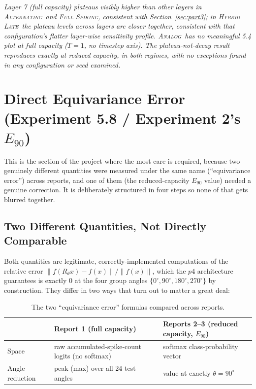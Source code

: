 \documentclass[11pt]{article}
\newcommand{\Analog}{\textsc{Analog}}
\newcommand{\Alternating}{\textsc{Alternating}}
\newcommand{\FullSpiking}{\textsc{Full Spiking}}
\newcommand{\HybridLate}{\textsc{Hybrid Late}}
\begin{document}
\FloatBarrier
\textit{Layer 7 (full capacity) plateaus visibly higher than other layers in \Alternating\ and
\FullSpiking, consistent with Section~\ref{sec:part3}; in \HybridLate\ the plateau levels across layers
are closer together, consistent with that configuration's flatter layer-wise sensitivity profile.
\Analog\ has no meaningful 5.4 plot at full capacity ($T{=}1$, no timestep axis). The plateau-not-decay
result reproduces exactly at reduced capacity, in both regimes, with no exceptions found in any
configuration or seed examined.}

\FloatBarrier

\section{Direct Equivariance Error (Experiment 5.8 / Experiment 2's $E_{90}$)}
\label{sec:part5}

This is the section of the project where the most care is required, because two genuinely different
quantities were measured under the same name (``equivariance error'') across reports, and one of them
(the reduced-capacity $E_{90}$ value) needed a genuine correction. It is deliberately structured in four
steps so none of that gets blurred together.

\subsection{Two Different Quantities, Not Directly Comparable}

Both quantities are legitimate, correctly-implemented computations of the relative error
$\|f(R_\theta x) - f(x)\| / \|f(x)\|$, which the $p4$ architecture guarantees is exactly 0 at the four
group angles $\{0^\circ,90^\circ,180^\circ,270^\circ\}$ by construction. They differ in two ways that
turn out to matter a great deal:

\begin{table}[H]
\centering
\begin{tabular}{@{}lp{4.6cm}p{4.6cm}@{}}
\toprule
 & \textbf{Report 1 (full capacity)} & \textbf{Reports 2--3 (reduced capacity, $E_{90}$)} \\
\midrule
Space & raw accumulated-spike-count logits (no softmax) & softmax class-probability vector \\
Angle reduction & peak (max) over all 24 test angles & value at exactly $\theta{=}90^\circ$ \\
\bottomrule
\end{tabular}
\caption{The two ``equivariance error'' formulas compared across reports.}
\end{table}
\end{document}
